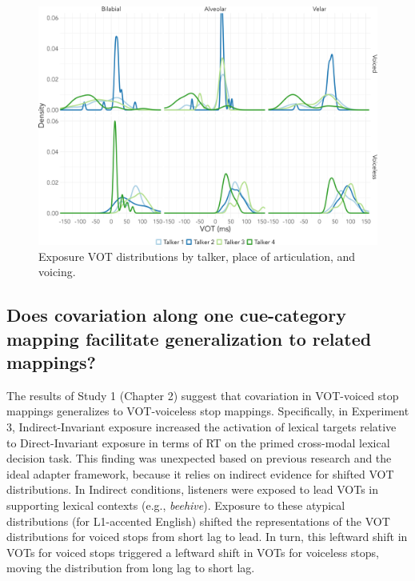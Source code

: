 \documentclass[
  12pt,
  twoside]{article}
\begin{document}
\begin{figure}[H]

{\centering \includegraphics[width=\textwidth]{figures/spk_voice_plot} 

}

\caption{Exposure VOT distributions by talker, place of articulation, and voicing.}\label{fig:spk-vot-fig}
\end{figure}

\hypertarget{does-covariation-along-one-cue-category-mapping-facilitate-generalization-to-related-mappings}{%
\subsection{Does covariation along one cue-category mapping facilitate generalization to related mappings?}\label{does-covariation-along-one-cue-category-mapping-facilitate-generalization-to-related-mappings}}

The results of Study 1 (Chapter 2) suggest that covariation in VOT-voiced stop mappings generalizes to VOT-voiceless stop mappings.
Specifically, in Experiment 3, Indirect-Invariant exposure increased the activation of lexical targets relative to Direct-Invariant exposure in terms of RT on the primed cross-modal lexical decision task.
This finding was unexpected based on previous research and the ideal adapter framework, because it relies on indirect evidence for shifted VOT distributions.
In Indirect conditions, listeners were exposed to lead VOTs in supporting lexical contexts (e.g., \emph{beehive}).
Exposure to these atypical distributions (for L1-accented English) shifted the representations of the VOT distributions for voiced stops from short lag to lead.
In turn, this leftward shift in VOTs for voiced stops triggered a leftward shift in VOTs for voiceless stops, moving the distribution from long lag to short lag.
\end{document}
